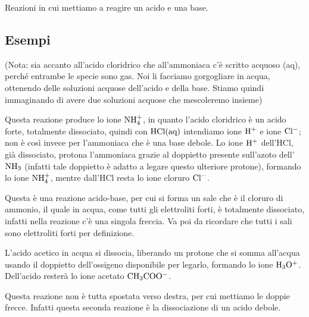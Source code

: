 Reazioni in cui mettiamo a reagire un acido e una base.
\subsection{Esempi}

\vspace{0.2cm}(Nota: sia accanto all'acido cloridrico che all'ammoniaca c'è scritto acquoso (aq), perché entrambe le specie sono gas. Noi li facciamo gorgogliare in acqua, ottenendo delle soluzioni acquose dell'acido e della base. Stiamo quindi immaginando di avere due soluzioni acquose che mescoleremo insieme)

Questa reazione produce lo ione $\rm NH_4^+$, in quanto l'acido cloridrico è un acido forte, totalmente dissociato, quindi con $\rm HCl(aq)$ intendiamo ione $\rm H^+$ e ione $\rm Cl^-$; non è così invece per l'ammoniaca che è una base debole. Lo ione $\rm H^+$ dell'HCl, già dissociato, protona l'ammoniaca grazie al doppietto presente sull'azoto dell'$\rm NH_3$ (infatti tale doppietto è adatto a legare questo ulteriore protone), formando lo ione $\rm NH_4^+$, mentre dall'HCl resta lo ione cloruro $\rm Cl^-$.

Questa è una reazione acido-base, per cui si forma un sale che è il cloruro di ammonio, il quale in acqua, come tutti gli elettroliti forti, è totalmente dissociato, infatti nella reazione c'è una singola freccia. Va poi da ricordare che tutti i sali sono elettroliti forti per definizione.

\vspace{0.2cm}

\vspace{0.2cm}L'acido acetico in acqua si dissocia, liberando un protone che si somma all'acqua usando il doppietto dell'ossigeno disponibile per legarlo, formando lo ione $\rm H_3O^+$. Dell'acido resterà lo ione acetato $\rm CH_3COO^-$.

Questa reazione non è tutta spostata verso destra, per cui mettiamo le doppie frecce. Infatti questa seconda reazione è la dissociazione di un acido debole.

\vspace{0.2cm}

